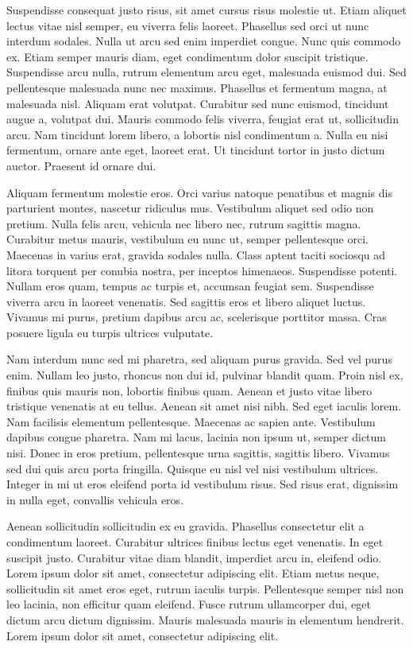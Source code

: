 Suspendisse consequat justo risus, sit amet cursus risus molestie ut. Etiam aliquet lectus vitae nisl semper, eu viverra felis laoreet. Phasellus sed orci ut nunc interdum sodales. Nulla ut arcu sed enim imperdiet congue. Nunc quis commodo ex. Etiam semper mauris diam, eget condimentum dolor suscipit tristique. Suspendisse arcu nulla, rutrum elementum arcu eget, malesuada euismod dui. Sed pellentesque malesuada nunc nec maximus. Phasellus et fermentum magna, at malesuada nisl. Aliquam erat volutpat. Curabitur sed nunc euismod, tincidunt augue a, volutpat dui. Mauris commodo felis viverra, feugiat erat ut, sollicitudin arcu. Nam tincidunt lorem libero, a lobortis nisl condimentum a. Nulla eu nisi fermentum, ornare ante eget, laoreet erat. Ut tincidunt tortor in justo dictum auctor. Praesent id ornare dui.

Aliquam fermentum molestie eros. Orci varius natoque penatibus et magnis dis parturient montes, nascetur ridiculus mus. Vestibulum aliquet sed odio non pretium. Nulla felis arcu, vehicula nec libero nec, rutrum sagittis magna. Curabitur metus mauris, vestibulum eu nunc ut, semper pellentesque orci. Maecenas in varius erat, gravida sodales nulla. Class aptent taciti sociosqu ad litora torquent per conubia nostra, per inceptos himenaeos. Suspendisse potenti. Nullam eros quam, tempus ac turpis et, accumsan feugiat sem. Suspendisse viverra arcu in laoreet venenatis. Sed sagittis eros et libero aliquet luctus. Vivamus mi purus, pretium dapibus arcu ac, scelerisque porttitor massa. Cras posuere ligula eu turpis ultrices vulputate.

Nam interdum nunc sed mi pharetra, sed aliquam purus gravida. Sed vel purus enim. Nullam leo justo, rhoncus non dui id, pulvinar blandit quam. Proin nisl ex, finibus quis mauris non, lobortis finibus quam. Aenean et justo vitae libero tristique venenatis at eu tellus. Aenean sit amet nisi nibh. Sed eget iaculis lorem. Nam facilisis elementum pellentesque. Maecenas ac sapien ante. Vestibulum dapibus congue pharetra. Nam mi lacus, lacinia non ipsum ut, semper dictum nisi. Donec in eros pretium, pellentesque urna sagittis, sagittis libero. Vivamus sed dui quis arcu porta fringilla. Quisque eu nisl vel nisi vestibulum ultrices. Integer in mi ut eros eleifend porta id vestibulum risus. Sed risus erat, dignissim in nulla eget, convallis vehicula eros.

Aenean sollicitudin sollicitudin ex eu gravida. Phasellus consectetur elit a condimentum laoreet. Curabitur ultrices finibus lectus eget venenatis. In eget suscipit justo. Curabitur vitae diam blandit, imperdiet arcu in, eleifend odio. Lorem ipsum dolor sit amet, consectetur adipiscing elit. Etiam metus neque, sollicitudin sit amet eros eget, rutrum iaculis turpis. Pellentesque semper nisl non leo lacinia, non efficitur quam eleifend. Fusce rutrum ullamcorper dui, eget dictum arcu dictum dignissim. Mauris malesuada mauris in elementum hendrerit. Lorem ipsum dolor sit amet, consectetur adipiscing elit.

